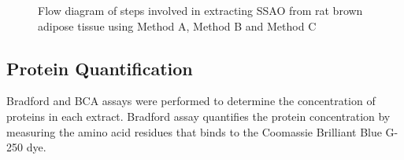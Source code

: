\documentclass[
  letterpaper,
  DIV=11,
  numbers=noendperiod]{scrreprt}
\begin{document}
\begin{figure}


\caption{\label{fig-methodflow}Flow diagram of steps involved in
extracting SSAO from rat brown adipose tissue using Method A, Method B
and Method C}

\end{figure}%

\subsection{\texorpdfstring{\textbf{Protein
Quantification}}{Protein Quantification}}\label{sec-protein-quantification}

Bradford and BCA assays were performed to determine the concentration of
proteins in each extract. Bradford assay quantifies the protein
concentration by measuring the amino acid residues that binds to the
Coomassie Brilliant Blue G-250 dye.
\end{document}
